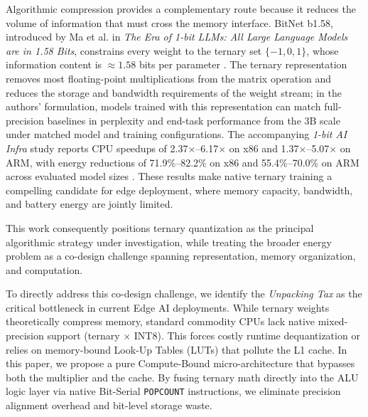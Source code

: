 \documentclass[10pt, conference]{IEEEtran}
\begin{document}
Algorithmic compression provides a complementary route because it reduces the volume of information that must cross the memory interface. BitNet b1.58, introduced by Ma et al. in \textit{The Era of 1-bit LLMs: All Large Language Models are in 1.58 Bits}, constrains every weight to the ternary set $\{-1, 0, 1\}$, whose information content is $\approx 1.58$ bits per parameter \cite{ma_era_2024}. The ternary representation removes most floating-point multiplications from the matrix operation and reduces the storage and bandwidth requirements of the weight stream; in the authors' formulation, models trained with this representation can match full-precision baselines in perplexity and end-task performance from the 3B scale under matched model and training configurations. The accompanying \textit{1-bit AI Infra} study reports CPU speedups of 2.37$\times$--6.17$\times$ on x86 and 1.37$\times$--5.07$\times$ on ARM, with energy reductions of 71.9\%--82.2\% on x86 and 55.4\%--70.0\% on ARM across evaluated model sizes \cite{1bit_infra}. These results make native ternary training a compelling candidate for edge deployment, where memory capacity, bandwidth, and battery energy are jointly limited.

This work consequently positions ternary quantization as the principal algorithmic strategy under investigation, while treating the broader energy problem as a co-design challenge spanning representation, memory organization, and computation.

To directly address this co-design challenge, we identify the \textit{Unpacking Tax} as the critical bottleneck in current Edge AI deployments. While ternary weights theoretically compress memory, standard commodity CPUs lack native mixed-precision support (ternary $\times$ INT8). This forces costly runtime dequantization or relies on memory-bound Look-Up Tables (LUTs) that pollute the L1 cache. In this paper, we propose a pure Compute-Bound micro-architecture that bypasses both the multiplier and the cache. By fusing ternary math directly into the ALU logic layer via native Bit-Serial \texttt{POPCOUNT} instructions, we eliminate precision alignment overhead and bit-level storage waste.
\end{document}

